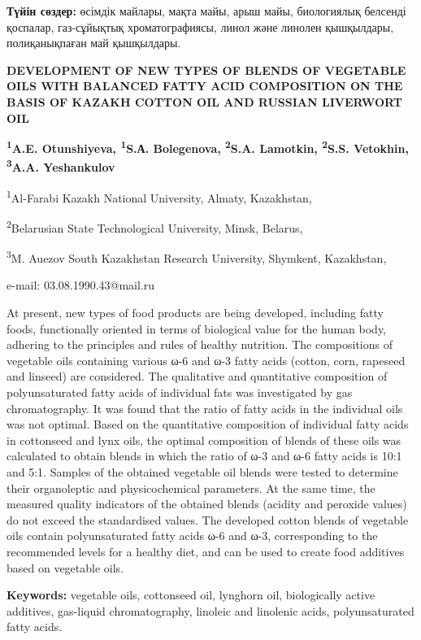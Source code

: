 {\bfseries Түйін сөздер:} өсімдік майлары, мақта майы, арыш майы,
биологиялық белсенді қоспалар, газ-сұйықтық хроматографиясы, линол және
линолен қышқылдары, полиқанықпаған май қышқылдары.

\begin{center}
{\large\bfseries DEVELOPMENT OF NEW TYPES OF BLENDS OF VEGETABLE OILS WITH
BALANCED FATTY ACID COMPOSITION ON THE BASIS OF KAZAKH COTTON OIL AND
RUSSIAN LIVERWORT OIL}

{\bfseries \textsuperscript{1}A.E. Otunshiyeva\envelope, \textsuperscript{1}S.А. Bolegenova, \textsuperscript{2}S.A. Lamotkin, \textsuperscript{2}S.S. Vetokhin, \textsuperscript{3}A.A. Yeshankulov}

\textsuperscript{1}Al-Farabi Kazakh National University, Almaty,
Kazakhstan,

\textsuperscript{2}Belarusian State Technological University, Minsk,
Belarus,

\textsuperscript{3}M. Auezov South Kazakhstan Research University,
Shymkent, Kazakhstan,

e-mail: 03.08.1990.43@mail.ru
\end{center}

At present, new types of food products are being developed, including
fatty foods, functionally oriented in terms of biological value for the
human body, adhering to the principles and rules of healthy nutrition.
The compositions of vegetable oils containing various ω-6 and ω-3 fatty
acids (cotton, corn, rapeseed and linseed) are considered. The
qualitative and quantitative composition of polyunsaturated fatty acids
of individual fats was investigated by gas chromatography. It was found
that the ratio of fatty acids in the individual oils was not optimal.
Based on the quantitative composition of individual fatty acids in
cottonseed and lynx oils, the optimal composition of blends of these
oils was calculated to obtain blends in which the ratio of ω-3 and ω-6
fatty acids is 10:1 and 5:1. Samples of the obtained vegetable oil
blends were tested to determine their organoleptic and physicochemical
parameters. At the same time, the measured quality indicators of the
obtained blends (acidity and peroxide values) do not exceed the
standardised values. The developed cotton blends of vegetable oils
contain polyunsaturated fatty acids ω-6 and ω-3, corresponding to the
recommended levels for a healthy diet, and can be used to create food
additives based on vegetable oils.

{\bfseries Keywords:} vegetable oils, cottonseed oil, lynghorn oil,
biologically active additives, gas-liquid chromatography, linoleic and
linolenic acids, polyunsaturated fatty acids.

